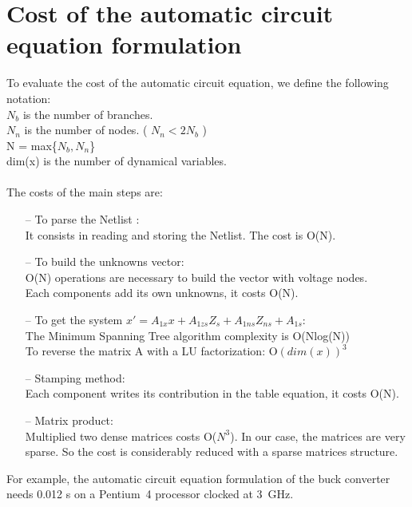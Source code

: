 \newpage

\section {Cost of the automatic circuit equation formulation}
To evaluate the cost of the automatic circuit equation, we define the following notation:\\
$N_{b}$ is the number of branches.\\
$N_{n}$ is the number of nodes. ( $N_{n} < 2N_{b}$ )\\
N = max\{$N_{b},N_{n}$\}\\
dim(x) is the number of dynamical variables.\\
\\
The costs of the main steps are:\\

\begin{itemize}

\item[--]To parse the Netlist : \\It consists in reading and storing the Netlist. The cost is O(N).
\item[--] To build the unknowns vector:\\
O(N) operations are necessary to build the vector with voltage nodes.\\
Each components add its own unknowns, it costs O(N).
\item[--] To get the system $x' = A_{1x}x +A_{1zs}Z_{s} + A_{1ns}Z_{ns}+A_{1s}$:\\
The Minimum Spanning Tree algorithm complexity is O(Nlog(N))\\
To reverse the matrix A with a LU factorization: O$(dim(x))^{3}$
\item[--] Stamping method:\\
Each component writes its contribution in the table equation, it costs O(N).
\item[--] Matrix product:\\
Multiplied two dense matrices costs O($N^{3}$). In our case, the matrices are very sparse. So
the cost is considerably reduced with a sparse matrices structure.

\end{itemize}
For example, the automatic circuit equation formulation of the buck converter needs 0.012 s on a Pentium~4 processor clocked at 3~GHz.





